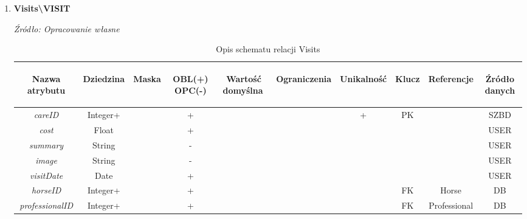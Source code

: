\documentclass[12pt,oneside]{report}
\begin{document}
\begin{enumerate}[start=10,label={\bfseries REL\textbackslash\arabic*}]
	\item \textbf{Visits\textbackslash VISIT} 
	\begin{table}[H]
		\caption{Opis schematu relacji Visits}
		\textit{Źródło: Opracowanie własne}
		\label{VisitsRelationSchema}
		\centering
		\begin{tabular}{|c|c|c|c|c|c|c|c|c|c|}
			\hline
			\begin{sideways}Nazwa atrybutu\end{sideways}& 
			\begin{sideways}Dziedzina \end{sideways}& 
			\begin{sideways}Maska \end{sideways}& 
			\begin{sideways}OBL(+) OPC(-)\end{sideways} & 
			\begin{sideways}Wartość domyślna$\ $\end{sideways}& 
			\begin{sideways}Ograniczenia\end{sideways} &
			\begin{sideways}Unikalność \end{sideways}& 
			\begin{sideways}Klucz \end{sideways}& 
			\begin{sideways}Referencje \end{sideways}&
			\begin{sideways}Źródło danych\end{sideways}\\
			\hline
			\textit{careID}&Integer+&&+&&&+&PK&&SZBD\\	
			\hline
			\textit{cost}&Float&&+&&&&&&USER\\	
			\hline	
			\textit{summary}&String&&-&&&&&&USER\\	
			\hline	
			\textit{image}&String&&-&&&&&&USER\\	
			\hline	
			\textit{visitDate}&Date&&+&&&&&&USER\\	
			\hline			
			\textit{horseID}&Integer+&&+&&&&FK&Horse&DB\\	
			\hline			
			\textit{professionalID}&Integer+&&+&&&&FK&Professional&DB\\	
			\hline
		\end{tabular}
	\end{table}
	

\end{enumerate}
\end{document}
